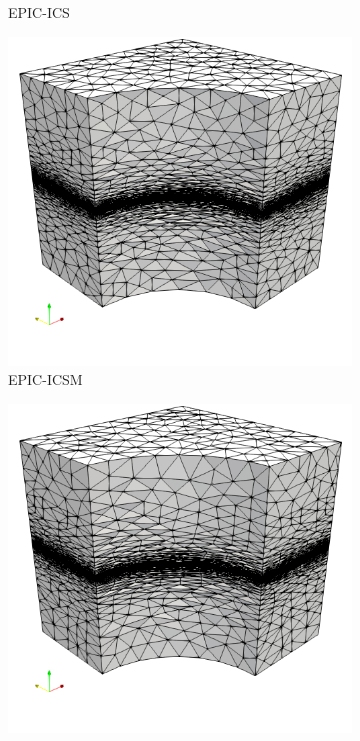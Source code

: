 \documentclass[3p,times,procedia,number]{elsarticle}
\begin{document}
\begin{figure}
\begin{subfigure}{.24\textwidth}
\caption{EPIC-ICS}
\end{subfigure}
\begin{subfigure}{.24\textwidth}
\centering
\includegraphics[width=\textwidth]{epic-icsm-cube-cylinder-linear.png}
\caption{EPIC-ICSM}
\end{subfigure}
\begin{subfigure}{.24\textwidth}
\centering
\includegraphics[width=\textwidth]{omega_h-cube-cylinder-linear.png}

\end{subfigure}
\end{figure}
\end{document}
